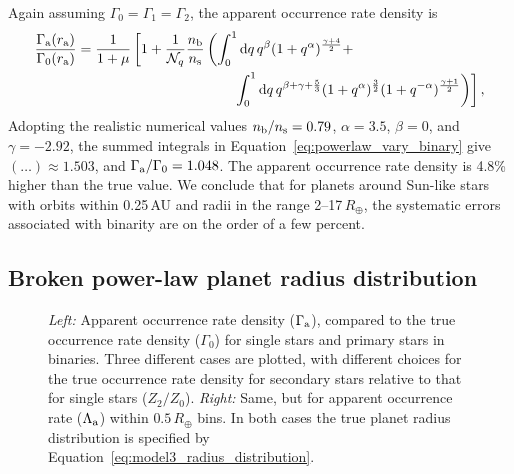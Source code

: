 \documentclass[12pt,modern]{aastex61}
\renewcommand{\a}{_{\rm a}}
\newcommand{\s}{_{\rm s}}
\renewcommand{\b}{_{\rm b}}
\begin{document}
Again assuming $\Gamma_0=\Gamma_1=\Gamma_2$, the apparent occurrence
rate density is 
\begin{align}
    \notag
    \frac{\Gamma\a(r\a)}{\Gamma_0(r\a)} 
    &=
    \frac{1}{1+\mu}
    \left[
      1 + \frac{1}{\mathcal{N}_q} \frac{n\b}{n\s}
    \left(
      \int_0^1 {\rm d}q\,q^\beta (1+q^\alpha)^{\frac{\gamma+4}{2}} +
      \right.
      \right. \\
      &\quad\quad\quad\quad\quad\quad\quad\quad\quad\quad\quad
      \left.\left.
      \int_0^1 {\rm d}q\,q^{\beta+\gamma+\frac{5}{3}} 
      (1+q^\alpha)^{\frac{3}{2}}
      (1+q^{-\alpha})^{\frac{\gamma+1}{2}}
    \right)
    \right],
    \label{eq:powerlaw_vary_binary}
\end{align}
Adopting the realistic numerical values $n\b/n\s=0.79$, $\alpha =
3.5$, $\beta=0$, and $\gamma=-2.92$, the summed integrals in
Equation~\ref{eq:powerlaw_vary_binary} give $(\ldots)\approx 1.503$,
and $\Gamma\a/\Gamma_0 = 1.048$.  The apparent occurrence rate density
is 4.8\% higher than the true value.  We conclude that for planets around
Sun-like stars with orbits within 0.25\,AU and radii in the range
2--17\,$R_\oplus$, the systematic errors associated with binarity are
on the order of a few percent.


\subsection{Broken power-law planet radius distribution}
\label{sec:model_3}

\begin{figure}[!t]
    \centering
    \caption{ {\it Left:} Apparent occurrence rate density
      ($\Gamma\a$), compared to the true occurrence rate density
      ($\Gamma_0$) for single stars and primary stars in binaries.
      Three different cases are plotted, with different choices for
      the true occurrence rate density for secondary stars relative to
      that for single stars ($Z_2/Z_0$).
      {\it Right:} Same, but for apparent occurrence
      rate ($\Lambda\a$) within $0.5\,R_\oplus$ bins.
      In both cases the true planet
      radius distribution is specified by
      Equation~\ref{eq:model3_radius_distribution}.
    }
    \label{fig:occ_rate_model_3_log}
\end{figure}
\end{document}
